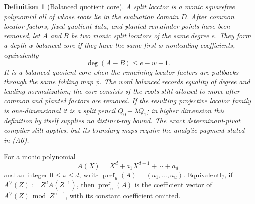 \documentclass[11pt,a4paper]{amsart}
\numberwithin{equation}{section}
\newtheorem{definition}[definition]{Definition}
\theoremstyle{remark}
\begin{document}
\begin{definition}[Balanced quotient core]
\label{def:balanced-quotient-core}
A \emph{split locator} is a monic squarefree polynomial all of whose roots
lie in the evaluation domain \(D\).
After common locator factors, fixed quotient data, and planted remainder
points have been removed, let \(A\) and \(B\) be two monic split
locators of the same degree \(e\).  They form a
\emph{depth-\(w\) balanced core} if they have the same first \(w\)
nonleading coefficients, equivalently
\[
                         \deg(A-B)\le e-w-1.
\]
It is a \emph{balanced quotient core} when the remaining locator factors
are pullbacks through the same folding map \(\phi\).  The word
\emph{balanced} records equality of degree and leading normalization;
the \emph{core} consists of the roots still allowed to move after common
and planted factors are removed.  If the resulting projective locator
family is one-dimensional it is a split pencil
\(Q_0+\lambda Q_1\); in higher dimension this definition by itself
supplies no distinct-ray bound.  The exact determinant-pivot compiler
still applies, but its boundary maps require the analytic payment stated
in \textup{(A6)}.
\end{definition}

For a monic polynomial
\[
 A(X)=X^d+a_1X^{d-1}+\cdots+a_d
\]
and an integer $0\le u\le d$, write
\(\operatorname{pref}_u(A)=(a_1,\ldots,a_u)\).  Equivalently, if
\(A^\vee(Z):=Z^dA(Z^{-1})\), then
\(\operatorname{pref}_u(A)\) is the coefficient vector of
\(A^\vee(Z)\bmod Z^{u+1}\), with its constant coefficient omitted.
\end{document}
